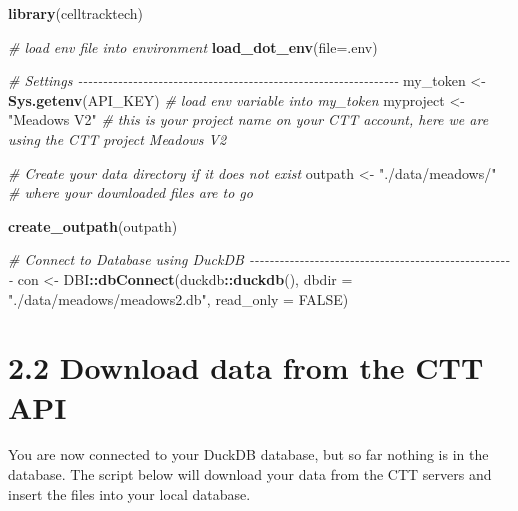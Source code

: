 \documentclass[
]{book}
\newenvironment{Shaded}{\begin{snugshade}}{\end{snugshade}}
\newcommand{\AttributeTok}[1]{\textcolor[rgb]{0.13,0.29,0.53}{#1}}
\newcommand{\CommentTok}[1]{\textcolor[rgb]{0.56,0.35,0.01}{\textit{#1}}}
\newcommand{\ConstantTok}[1]{\textcolor[rgb]{0.56,0.35,0.01}{#1}}
\newcommand{\FunctionTok}[1]{\textcolor[rgb]{0.13,0.29,0.53}{\textbf{#1}}}
\newcommand{\NormalTok}[1]{#1}
\newcommand{\OtherTok}[1]{\textcolor[rgb]{0.56,0.35,0.01}{#1}}
\newcommand{\SpecialCharTok}[1]{\textcolor[rgb]{0.81,0.36,0.00}{\textbf{#1}}}
\newcommand{\StringTok}[1]{\textcolor[rgb]{0.31,0.60,0.02}{#1}}
\begin{document}
\begin{Shaded}
\begin{Highlighting}[]
\FunctionTok{library}\NormalTok{(celltracktech)}

\CommentTok{\# load env file into environment}
\FunctionTok{load\_dot\_env}\NormalTok{(}\AttributeTok{file=}\StringTok{\textquotesingle{}.env\textquotesingle{}}\NormalTok{)}

\CommentTok{\# Settings {-}{-}{-}{-}{-}{-}{-}{-}{-}{-}{-}{-}{-}{-}{-}{-}{-}{-}{-}{-}{-}{-}{-}{-}{-}{-}{-}{-}{-}{-}{-}{-}{-}{-}{-}{-}{-}{-}{-}{-}{-}{-}{-}{-}{-}{-}{-}{-}{-}{-}{-}{-}{-}{-}{-}{-}{-}{-}{-}{-}{-}{-}{-}{-}}
\NormalTok{my\_token }\OtherTok{\textless{}{-}} \FunctionTok{Sys.getenv}\NormalTok{(}\StringTok{\textquotesingle{}API\_KEY\textquotesingle{}}\NormalTok{) }\CommentTok{\# load env variable into my\_token}
\NormalTok{myproject }\OtherTok{\textless{}{-}} \StringTok{"Meadows V2"} \CommentTok{\# this is your project name on your CTT account, here we are using the CTT project \textquotesingle{}Meadows V2\textquotesingle{}}

\CommentTok{\# Create your data directory if it does not exist}
\NormalTok{outpath }\OtherTok{\textless{}{-}} \StringTok{"./data/meadows/"} \CommentTok{\# where your downloaded files are to go}

\FunctionTok{create\_outpath}\NormalTok{(outpath)}

\CommentTok{\# Connect to Database using DuckDB {-}{-}{-}{-}{-}{-}{-}{-}{-}{-}{-}{-}{-}{-}{-}{-}{-}{-}{-}{-}{-}{-}{-}{-}{-}{-}{-}{-}{-}{-}{-}{-}{-}{-}{-}{-}{-}{-}{-}{-}{-}{-}{-}{-}{-}{-}{-}{-}{-}{-}{-}{-}{-}}
\NormalTok{con }\OtherTok{\textless{}{-}}\NormalTok{ DBI}\SpecialCharTok{::}\FunctionTok{dbConnect}\NormalTok{(duckdb}\SpecialCharTok{::}\FunctionTok{duckdb}\NormalTok{(), }
                      \AttributeTok{dbdir =} \StringTok{"./data/meadows/meadows2.db"}\NormalTok{, }
                      \AttributeTok{read\_only =} \ConstantTok{FALSE}\NormalTok{)}
\end{Highlighting}
\end{Shaded}

\section{2.2 Download data from the CTT API}\label{download-data-from-the-ctt-api}

You are now connected to your DuckDB database, but so far nothing is in the database. The script below will download your data from the CTT servers and insert the files into your local database.
\end{document}
